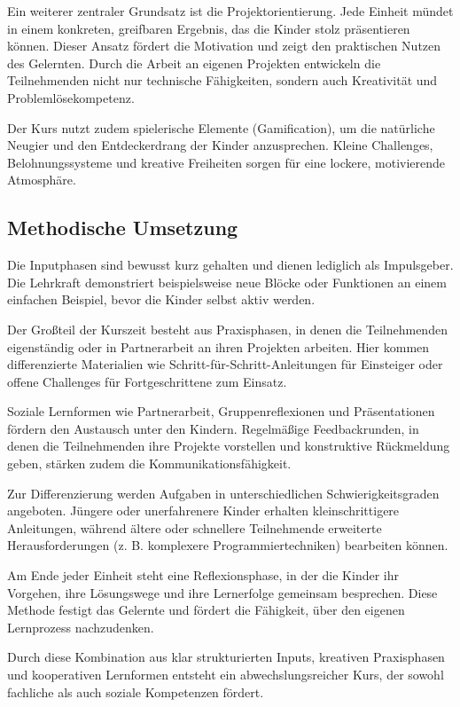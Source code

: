 Ein weiterer zentraler Grundsatz ist die Projektorientierung. Jede Einheit mündet in einem konkreten, greifbaren Ergebnis, das die Kinder stolz präsentieren können. Dieser Ansatz fördert die Motivation und zeigt den praktischen Nutzen des Gelernten. Durch die Arbeit an eigenen Projekten entwickeln die Teilnehmenden nicht nur technische Fähigkeiten, sondern auch Kreativität und Problemlösekompetenz.

Der Kurs nutzt zudem spielerische Elemente (Gamification), um die natürliche Neugier und den Entdeckerdrang der Kinder anzusprechen. Kleine Challenges, Belohnungssysteme und kreative Freiheiten sorgen für eine lockere, motivierende Atmosphäre.

\subsection{Methodische Umsetzung}
\label{sec:Methodische Umsetzung}
Die Inputphasen sind bewusst kurz gehalten und dienen lediglich als Impulsgeber. Die Lehrkraft demonstriert beispielsweise neue Blöcke oder Funktionen an einem einfachen Beispiel, bevor die Kinder selbst aktiv werden.

Der Großteil der Kurszeit besteht aus Praxisphasen, in denen die Teilnehmenden eigenständig oder in Partnerarbeit an ihren Projekten arbeiten. Hier kommen differenzierte Materialien wie Schritt-für-Schritt-Anleitungen für Einsteiger oder offene Challenges für Fortgeschrittene zum Einsatz.

Soziale Lernformen wie Partnerarbeit, Gruppenreflexionen und Präsentationen fördern den Austausch unter den Kindern. Regelmäßige Feedbackrunden, in denen die Teilnehmenden ihre Projekte vorstellen und konstruktive Rückmeldung geben, stärken zudem die Kommunikationsfähigkeit.

Zur Differenzierung werden Aufgaben in unterschiedlichen Schwierigkeitsgraden angeboten. Jüngere oder unerfahrenere Kinder erhalten kleinschrittigere Anleitungen, während ältere oder schnellere Teilnehmende erweiterte Herausforderungen (z. B. komplexere Programmiertechniken) bearbeiten können.

Am Ende jeder Einheit steht eine Reflexionsphase, in der die Kinder ihr Vorgehen, ihre Lösungswege und ihre Lernerfolge gemeinsam besprechen. Diese Methode festigt das Gelernte und fördert die Fähigkeit, über den eigenen Lernprozess nachzudenken.

Durch diese Kombination aus klar strukturierten Inputs, kreativen Praxisphasen und kooperativen Lernformen entsteht ein abwechslungsreicher Kurs, der sowohl fachliche als auch soziale Kompetenzen fördert.